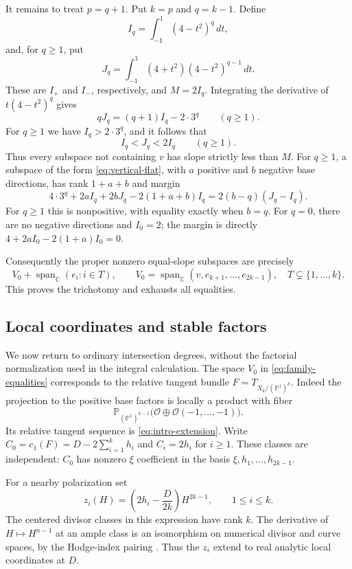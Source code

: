 \documentclass[11pt]{amsart}
\theoremstyle{definition}
\theoremstyle{remark}
\newcommand{\PP}{\mathbb P}
\newcommand{\CC}{\mathbb C}
\newcommand{\Span}{\operatorname{span}}
\begin{document}
It remains to treat $p=q+1$. Put $k=p$ and $q=k-1$. Define
\[
 I_q=\int_{-1}^1(4-t^2)^q\,dt,
\]
and, for $q\ge1$, put
\[
 J_q=\int_{-1}^1(4+t^2)(4-t^2)^{q-1}\,dt.
\]
These are $I_+$ and $I_-$, respectively, and $M=2I_q$. Integrating
the derivative of $t(4-t^2)^q$ gives
\begin{equation}\label{eq:integral-identity}
 qJ_q=(q+1)I_q-2\cdot3^q\qquad(q\ge1).
\end{equation}
For $q\ge1$ we have $I_q>2\cdot3^q$, and it follows that
\begin{equation}\label{eq:integral-bounds}
 I_q<J_q<2I_q\qquad(q\ge1).
\end{equation}
Thus every subspace not containing $v$ has slope strictly less than
$M$. For $q\ge1$, a subspace of the form \eqref{eq:vertical-flat}, with $a$ positive
and $b$ negative base directions, has rank $1+a+b$ and margin
\begin{equation}\label{eq:family-margin}
 4\cdot3^q+2aI_q+2bJ_q-2(1+a+b)I_q
       =2(b-q)(J_q-I_q).
\end{equation}
For $q\ge1$ this is nonpositive, with equality exactly when $b=q$.
For $q=0$, there are no negative directions and $I_0=2$; the margin is
directly $4+2aI_0-2(1+a)I_0=0$.

Consequently the proper nonzero equal-slope subspaces are precisely
\begin{equation}\label{eq:family-equalities}
 V_0+\Span_\CC(e_i:i\in T),\qquad
 V_0=\Span_\CC(v,e_{k+1},\ldots,e_{2k-1}),\quad
 T\subsetneq\{1,\ldots,k\}.
\end{equation}
This proves the trichotomy and exhausts all equalities.

\subsection{Local coordinates and stable factors}
We now return to ordinary intersection degrees, without the factorial
normalization used in the integral calculation.
The space $V_0$ in \eqref{eq:family-equalities} corresponds to the relative
tangent bundle $F=T_{X_k/(\PP^1)^k}$. Indeed the projection to the
positive base factors is locally a product with fiber
\[
 \PP_{(\PP^1)^{k-1}}
       \bigl(\mathcal O\oplus\mathcal O(-1,\ldots,-1)\bigr).
\]
Its relative tangent sequence is \eqref{eq:intro-extension}.
Write $C_0=c_1(F)=D-2\sum_{i=1}^kh_i$ and $C_i=2h_i$ for $i\ge1$.
These classes are independent: $C_0$ has nonzero $\xi$ coefficient in
the basis $\xi,h_1,\ldots,h_{2k-1}$.

For a nearby polarization set
\begin{equation}\label{eq:family-z}
 z_i(H)=\left(2h_i-\frac{D}{2k}\right)H^{2k-1},\qquad1\le i\le k.
\end{equation}
The centered divisor classes in this expression have rank $k$.
The derivative of $H\mapsto H^{n-1}$ at an ample class is an isomorphism
on numerical divisor and curve spaces, by the Hodge-index pairing
\cite[Theorem~6.4 and Corollary~6.5]{GRT}. Thus the $z_i$ extend to
real analytic local coordinates at $D$.
\end{document}
